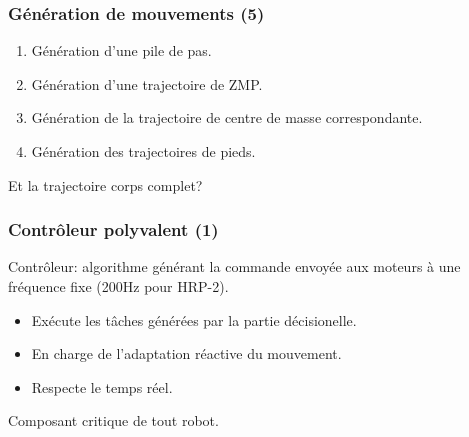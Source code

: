 \documentclass[14pt,utf8x,hyperref={pdfpagelabels=false}]{beamer}
\begin{document}
\begin{slideDecision}
  \frametitle{Génération de mouvements (5)}
  \begin{changeleftmargin}{1.5cm}
  \begin{center}
    \begin{enumerate}
      \item Génération d'une pile de pas.
      \item Génération d'une trajectoire de ZMP.
      \item Génération de la trajectoire de centre de masse
        correspondante.
      \item Génération des trajectoires de pieds.
    \end{enumerate}

    \bigskip

    \alert{Et la trajectoire corps complet?}
  \end{center}
  \end{changeleftmargin}
\end{slideDecision}



\begin{slideAction}
  \frametitle{Contrôleur polyvalent (1)}

  \begin{changeleftmargin}{1.1cm}
  \begin{center}
    Contrôleur: algorithme générant la commande envoyée aux moteurs à
    une fréquence fixe (200Hz pour HRP-2).

    \bigskip

    \begin{itemize}
    \item Exécute les tâches générées par la partie décisionelle.
    \item En charge de l'adaptation réactive du mouvement.
    \item Respecte le temps réel.
    \end{itemize}

    \bigskip

    Composant \alert{critique} de tout robot.
  \end{center}
  \end{changeleftmargin}
\end{slideAction}
\end{document}
